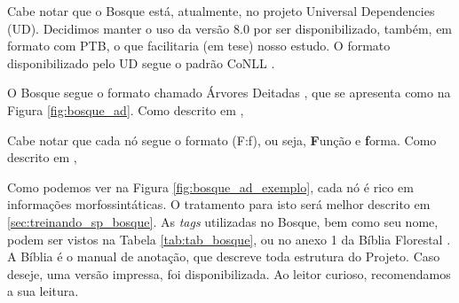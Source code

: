 Cabe notar que o Bosque está, atualmente, no projeto Universal Dependencies (UD). Decidimos manter o uso da versão 8.0 por ser disponibilizado, também, em formato com PTB, o que facilitaria (em tese) nosso estudo. O formato disponibilizado pelo UD segue o padrão CoNLL \cite{nivre2007conll}.
\begin{center}

\end{center}
O Bosque segue o formato chamado Árvores Deitadas \cite[p~6]{afonso2006arvores}, que se apresenta como na Figura \ref{fig:bosque_ad}. Como descrito em \cite{freitas2007biblia}, 
\begin{quote}
\end{quote}
\begin{center}

\end{center}
Cabe notar que cada nó segue o formato (F:f), ou seja, \textbf{F}unção e \textbf{f}orma. Como descrito em \cite{freitas2007biblia},
\begin{quote}
\end{quote}
    
Como podemos ver na Figura \ref{fig:bosque_ad_exemplo}, cada nó é rico em informações morfossintáticas. O tratamento para isto será melhor descrito em \ref{sec:treinando_sp_bosque}. As \textit{tags} utilizadas no Bosque, bem como seu nome, podem ser vistos na Tabela \ref{tab:tab_bosque}, ou no anexo 1 da Bíblia Florestal \cite{freitas2007biblia}. A Bíblia é o manual de anotação, que descreve toda estrutura do Projeto. Caso deseje, uma versão impressa, \cite{afonso2006arvores} foi disponibilizada. Ao leitor curioso, recomendamos a sua leitura. 


